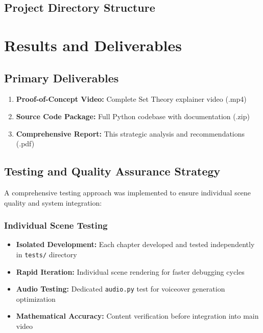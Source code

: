\documentclass[12pt,a4paper]{article}
\begin{document}
\subsection{Project Directory Structure}

\DTsetlength{0.2em}{1em}{0.2em}{0.4pt}{1.6pt}

\section{Results and Deliverables}

\subsection{Primary Deliverables}
\begin{enumerate}
    \item \textbf{Proof-of-Concept Video:} Complete Set Theory explainer video (.mp4)
    \item \textbf{Source Code Package:} Full Python codebase with documentation (.zip)
    \item \textbf{Comprehensive Report:} This strategic analysis and recommendations (.pdf)
\end{enumerate}

\subsection{Testing and Quality Assurance Strategy}

A comprehensive testing approach was implemented to ensure individual scene quality and system integration:

\subsubsection{Individual Scene Testing}
\begin{itemize}
    \item \textbf{Isolated Development:} Each chapter developed and tested independently in \texttt{tests/} directory
    \item \textbf{Rapid Iteration:} Individual scene rendering for faster debugging cycles
    \item \textbf{Audio Testing:} Dedicated \texttt{audio.py} test for voiceover generation optimization
    \item \textbf{Mathematical Accuracy:} Content verification before integration into main video
\end{itemize}
\end{document}

